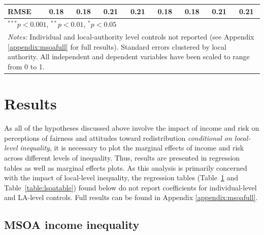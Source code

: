 \documentclass[12pt, letter]{scrartcl}
\begin{document}
\begin{table}[t]
{\begin{tabular}{l c c c c c c c c}
RMSE                                        & 0.18          & 0.18          & 0.21          & 0.21          & 0.18          & 0.18          & 0.21          & 0.21          \\
\toprule[1.5pt]
\multicolumn{9}{l}{\normalsize{$^{***}p<0.001$, $^{**}p<0.01$, $^*p<0.05$}} \\[-4pt]
\multicolumn{9}{l}{\multirow{3}{590pt}{\normalsize{\textit{Notes:} Individual and local-authority level controls not reported (see Appendix \ref{appendix:msoafull} for full results). Standard errors clustered by local authority. All independent and dependent variables have been scaled to range from 0 to 1.}}} \\
\\
\end{tabular}}
\label{table:msoatable}
\end{table}


\section{Results}

As all of the hypotheses discussed above involve the impact of income and risk on perceptions of fairness and attitudes toward redistribution \textit{conditional on local-level inequality}, it is necessary to plot the marginal effects of income and risk across different levels of inequality. Thus, results are presented in regression tables as well as marginal effects plots. As this analysis is primarily concerned with the impact of local-level inequality, the regression tables (Table~\ref{table:msoatable} and Table~\ref{table:lsoatable}) found below do not report coefficients for individual-level and LA-level controls. Full results can be found in Appendix \ref{appendix:msoafull}.

\subsection{MSOA income inequality}
\end{document}
